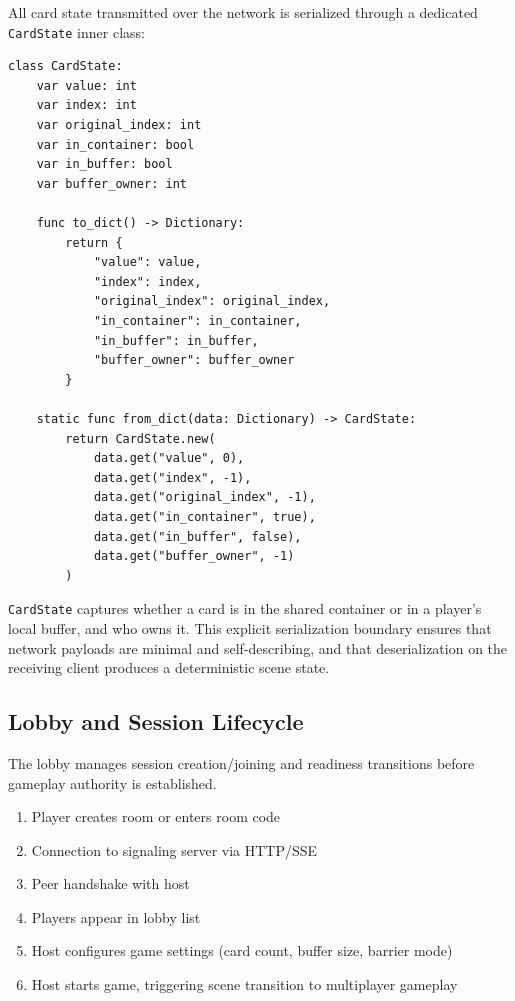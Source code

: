 All card state transmitted over the network is serialized through a dedicated \texttt{CardState} inner class:

\begin{lstlisting}[caption={CardState transport protocol (multiplayer\_card\_manager.gd, lines 6--49)}]
class CardState:
    var value: int
    var index: int
    var original_index: int
    var in_container: bool
    var in_buffer: bool
    var buffer_owner: int

    func to_dict() -> Dictionary:
        return {
            "value": value,
            "index": index,
            "original_index": original_index,
            "in_container": in_container,
            "in_buffer": in_buffer,
            "buffer_owner": buffer_owner
        }

    static func from_dict(data: Dictionary) -> CardState:
        return CardState.new(
            data.get("value", 0),
            data.get("index", -1),
            data.get("original_index", -1),
            data.get("in_container", true),
            data.get("in_buffer", false),
            data.get("buffer_owner", -1)
        )
\end{lstlisting}

\texttt{CardState} captures whether a card is in the shared container or in a player's local buffer, and who owns it. This explicit serialization boundary ensures that network payloads are minimal and self-describing, and that deserialization on the receiving client produces a deterministic scene state.

\subsection{Lobby and Session Lifecycle}
\label{subsec:lobby-system}

The lobby manages session creation/joining and readiness transitions before gameplay authority is established.

\begin{enumerate}
    \item Player creates room or enters room code
    \item Connection to signaling server via HTTP/SSE
    \item Peer handshake with host
    \item Players appear in lobby list
    \item Host configures game settings (card count, buffer size, barrier mode)
    \item Host starts game, triggering scene transition to multiplayer gameplay
\end{enumerate}

